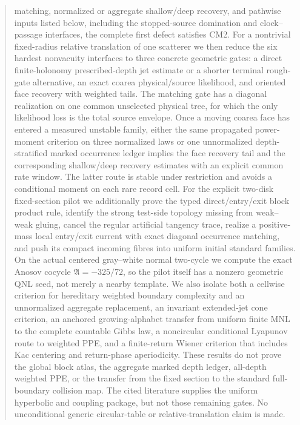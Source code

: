 \documentclass[11pt]{article}
\begin{document}
\begin{abstract}
matching, normalized or aggregate shallow/deep recovery, and pathwise inputs
listed below, including the stopped-source domination and clock--passage
interfaces, the complete first defect satisfies CM2.  For a nontrivial
fixed-radius relative translation of one scatterer we then reduce the six
hardest nonvacuity interfaces to three concrete geometric gates: a
direct finite-holonomy prescribed-depth jet estimate or a shorter
terminal rough-gate alternative, an exact coarea
physical/source likelihood, and oriented face recovery with weighted tails.
The matching gate has a diagonal realization on one common unselected
physical tree, for which the only likelihood loss is the total source
envelope.  Once a moving coarea face has entered a measured unstable family,
either the same propagated power-moment criterion on three normalized laws
or one unnormalized depth-stratified marked occurrence ledger implies the
face recovery tail and the corresponding shallow/deep recovery estimates
with an explicit common rate window.  The latter route is stable under
restriction and avoids a conditional moment on each rare record cell.
For the explicit two-disk fixed-section pilot we additionally prove the
typed direct/entry/exit block product rule, identify the strong test-side
topology missing from weak--weak gluing, cancel the regular artificial
tangency trace, realize a positive-mass local entry/exit current with exact
diagonal occurrence matching, and push its compact incoming fibres into
uniform initial standard families.  On the actual centered gray--white
normal two-cycle we compute the exact Anosov cocycle
$\mathfrak A=-325/72$, so the pilot itself has a nonzero geometric QNL seed,
not merely a nearby template.  We also isolate both a cellwise criterion
for hereditary weighted boundary complexity and an unnormalized aggregate
replacement, an invariant extended-jet cone
criterion, an anchored growing-alphabet transfer from uniform finite MNL to
the complete countable Gibbs law, a noncircular conditional Lyapunov route to weighted PPE, and a
finite-return Wiener criterion that includes Kac centering and return-phase
aperiodicity.  These results do not prove the global block atlas, the
aggregate marked depth ledger, all-depth weighted PPE, or the transfer from the fixed section to
the standard full-boundary collision map.  The cited literature supplies the
uniform hyperbolic and coupling package, but not those remaining gates.  No
unconditional generic circular-table or relative-translation claim is made.

\end{abstract}
\end{document}
